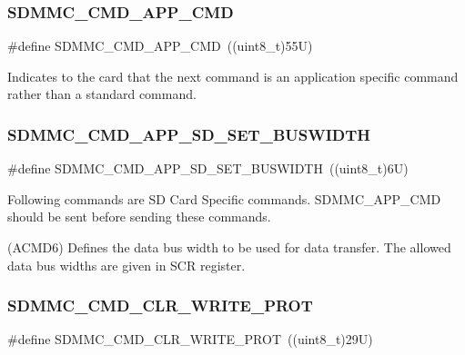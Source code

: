 \subsubsection{\texorpdfstring{SDMMC\_CMD\_APP\_CMD}{SDMMC\_CMD\_APP\_CMD}}
{\footnotesize\ttfamily \#define S\+D\+M\+M\+C\+\_\+\+C\+M\+D\+\_\+\+A\+P\+P\+\_\+\+C\+MD~((uint8\+\_\+t)55\+U)}

Indicates to the card that the next command is an application specific command rather than a standard command. \mbox{\label{group___s_d_m_m_c___l_l___exported___constants_ga8cfe5dc1ac1f27c23326aeaf3f1bc7f6}} 
\subsubsection{\texorpdfstring{SDMMC\_CMD\_APP\_SD\_SET\_BUSWIDTH}{SDMMC\_CMD\_APP\_SD\_SET\_BUSWIDTH}}
{\footnotesize\ttfamily \#define S\+D\+M\+M\+C\+\_\+\+C\+M\+D\+\_\+\+A\+P\+P\+\_\+\+S\+D\+\_\+\+S\+E\+T\+\_\+\+B\+U\+S\+W\+I\+D\+TH~((uint8\+\_\+t)6\+U)}



Following commands are SD Card Specific commands. S\+D\+M\+M\+C\+\_\+\+A\+P\+P\+\_\+\+C\+MD should be sent before sending these commands. 

(A\+C\+M\+D6) Defines the data bus width to be used for data transfer. The allowed data bus widths are given in S\+CR register. \mbox{\label{group___s_d_m_m_c___l_l___exported___constants_gae73e139ab789bd8d2eac5de4268c4880}} 
\subsubsection{\texorpdfstring{SDMMC\_CMD\_CLR\_WRITE\_PROT}{SDMMC\_CMD\_CLR\_WRITE\_PROT}}
{\footnotesize\ttfamily \#define S\+D\+M\+M\+C\+\_\+\+C\+M\+D\+\_\+\+C\+L\+R\+\_\+\+W\+R\+I\+T\+E\+\_\+\+P\+R\+OT~((uint8\+\_\+t)29\+U)}

